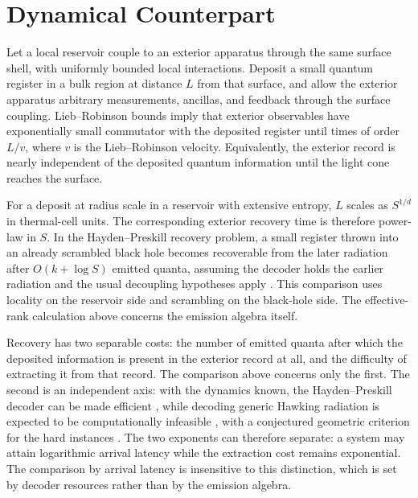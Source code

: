 \documentclass[12pt]{article}
\begin{document}
\section{Dynamical Counterpart}

Let a local reservoir couple to an exterior apparatus through the same
surface shell, with uniformly bounded local interactions.  Deposit a
small quantum register in a bulk region at distance $L$ from that
surface, and allow the exterior apparatus arbitrary measurements,
ancillas, and feedback through the surface coupling.  Lieb--Robinson
bounds \cite{LiebRobinson1972,HastingsKoma2006,NachtergaeleSims2010}
imply that exterior observables have exponentially small commutator with
the deposited register until times of order $L/v$, where $v$ is the
Lieb--Robinson velocity.  Equivalently, the exterior record is nearly
independent of the deposited quantum information until the light cone
reaches the surface.

For a deposit at radius scale in a reservoir with extensive entropy,
$L$ scales as $S^{1/d}$ in thermal-cell units.  The corresponding
exterior recovery time is therefore power-law in $S$.  In the
Hayden--Preskill recovery problem, a small register thrown into an
already scrambled black hole becomes recoverable from the later
radiation after $O(k+\log S)$ emitted quanta, assuming the decoder holds
the earlier radiation and the usual decoupling hypotheses apply
\cite{HaydenPreskill2007,SlobodovLong}.  This comparison uses locality
on the reservoir side and scrambling on the black-hole side.  The
effective-rank calculation above concerns the emission algebra itself.

Recovery has two separable costs: the number of emitted quanta after
which the deposited information is present in the exterior record at
all, and the difficulty of extracting it from that record.  The
comparison above concerns only the first.  The second is an independent
axis: with the dynamics known, the Hayden--Preskill decoder can be made
efficient \cite{YoshidaKitaev2017}, while decoding generic Hawking
radiation is expected to be computationally infeasible
\cite{HarlowHayden2013}, with a conjectured geometric criterion for the
hard instances \cite{BrownGharibyanPeningtonSusskind2020}.  The two
exponents can therefore separate: a system may attain logarithmic
arrival latency while the extraction cost remains exponential.  The
comparison by arrival latency is insensitive to this distinction, which
is set by decoder resources rather than by the emission algebra.
\end{document}
